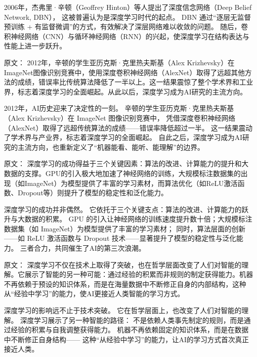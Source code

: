 2006年，杰弗里·辛顿（Geoffrey Hinton）等人提出了深度信念网络（Deep Belief Network, DBN），  
这被普遍认为是深度学习时代的起点。  
DBN 通过“逐层无监督预训练 + 有监督微调”的方式，有效解决了深层网络难以收敛的问题。  
随后，卷积神经网络（CNN）与循环神经网络（RNN）的兴起，使深度学习在结构表达与性能上进一步跃升。

原文：
2012年，辛顿的学生亚历克斯·克里热夫斯基（Alex Krizhevsky）在ImageNet图像识别竞赛中，使用深度卷积神经网络（AlexNet）取得了远超其他方法的成绩，错误率比传统算法降低了一半以上。这一结果震惊了整个学术界和工业界，标志着深度学习的全面崛起。从此以后，深度学习成为AI研究的主流方向。

2012年，AI历史迎来了决定性的一刻。  
辛顿的学生亚历克斯·克里热夫斯基（Alex Krizhevsky）在 ImageNet 图像识别竞赛中，  
凭借深度卷积神经网络（AlexNet）取得了远超传统算法的成绩——错误率降低超过一半。  
这一结果震动了学术界与产业界，标志着深度学习的全面崛起。  
自此之后，深度学习成为AI研究的主流方向，也重新定义了“机器能看、能听、能理解”的边界。

原文：
深度学习的成功得益于三个关键因素：算法的改进、计算能力的提升和大数据的支撑。GPU的引入极大地加速了神经网络的训练，大规模标注数据集的出现（如ImageNet）为模型提供了丰富的学习素材，而算法优化（如ReLU激活函数、Dropout等）则提升了模型的稳定性和泛化能力。

深度学习的成功并非偶然。  
它依托于三个关键支点：算法的改进、计算能力的跃升与大数据的积累。  
GPU 的引入让神经网络的训练速度提升数十倍；大规模标注数据集（如 ImageNet）为模型提供了丰富的学习素材；  
同时，算法层面的创新——如 ReLU 激活函数与 Dropout 技术——显著提升了模型的稳定性与泛化能力。  
三者合力，共同催生了AI的第三次浪潮。

原文：
深度学习不仅在技术上取得了突破，也在哲学层面改变了人们对智能的理解。它展示了智能的另一种可能：通过经验的积累而非规则的制定获得能力。机器不再依赖于预设的知识体系，而是在海量数据中不断修正自身的内部结构，这种从“经验中学习”的能力，使AI更接近人类智能的学习方式。

深度学习的影响远不止于技术突破。  
它在哲学层面上，也改变了人们对智能的理解。  
深度学习展示了另一种智能的路径：  
不是依赖人类事先制定的规则，而是通过经验的积累与自我调整获得能力。  
机器不再依赖固定的知识体系，而是在数据中不断修正自身结构——  
这种“从经验中学习”的能力，让AI的学习方式首次真正接近人类。

